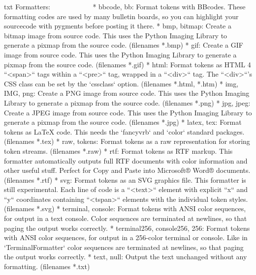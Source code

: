 \documentclass[11pt,oneside]{book}
\begin{document}
\begin{common-format}
\begin{xverbatim}{txt}
Formatters:
~~~~~~~~~~~
* bbcode, bb:
    Format tokens with BBcodes. 
    These formatting codes are used by
     many bulletin boards, so you can highlight
      your sourcecode with pygments before posting it there. 
* bmp, bitmap:
    Create a bitmap image from source code. 
    This uses the Python Imaging Library to generate a
     pixmap from the source code. (filenames *.bmp)
* gif:
    Create a GIF image from source code.
     This uses the Python Imaging Library to 
     generate a pixmap from the source code. (filenames *.gif)
* html:
    Format tokens as HTML 4
     ``<span>`` tags within a ``<pre>`` tag, wrapped in a ``<div>`` tag. 
     The ``<div>``'s CSS class can be set by the `cssclass` option. (filenames *.html, *.htm)
* img, IMG, png:
    Create a PNG image from source code. 
    This uses the Python Imaging Library to generate a
     pixmap from the source code. (filenames *.png)
* jpg, jpeg:
    Create a JPEG image from source code. This uses 
    the Python Imaging Library to generate a pixmap from
     the source code. (filenames *.jpg)
* latex, tex:
    Format tokens as LaTeX code. This needs the `fancyvrb`
     and `color` standard packages. (filenames *.tex)
* raw, tokens:
    Format tokens as a raw representation for storing
     token streams. (filenames *.raw)
* rtf:
    Format tokens as RTF markup. 
    This formatter automatically outputs full RTF documents 
    with color information and other useful stuff. Perfect for
    Copy and Paste into Microsoft® Word® documents. (filenames *.rtf)
* svg:
    Format tokens as an SVG graphics file.  This formatter 
    is still experimental. Each line of code is a ``<text>`` 
    element with explicit ``x`` and ``y`` coordinates containing 
    ``<tspan>`` elements with the individual token styles. (filenames *.svg)
* terminal, console:
    Format tokens with ANSI color sequences, for output in 
    a text console. Color sequences are terminated at newlines, 
    so that paging the output works correctly. 
* terminal256, console256, 256:
    Format tokens with ANSI color 
    sequences, for output in a
     256-color terminal or console. 
     Like in `TerminalFormatter` 
     color sequences are terminated
      at newlines, so that paging 
     the output works correctly. 
* text, null:
    Output the text unchanged without
     any formatting. (filenames *.txt)
\end{xverbatim}


\end{common-format}
\end{document}
